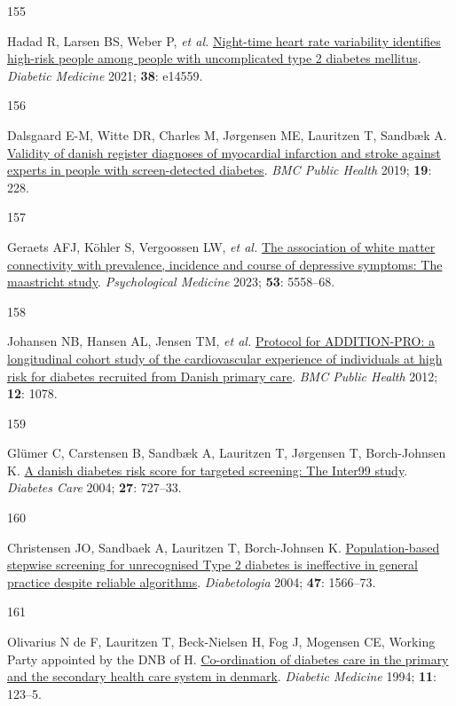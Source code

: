 \documentclass[
  a4paper,
  headsepline=true,
  open=any]{scrbook}
\newlength{\cslhangindent}
\newlength{\csllabelwidth}
\newlength{\cslentryspacingunit} %
\newenvironment{CSLReferences}[2] %
 {%
  \setlength{\parindent}{0pt}
  \ifodd #1
  \let\oldpar\par
  \def\par{\hangindent=\cslhangindent\oldpar}
  \fi
  \setlength{\parskip}{#2\cslentryspacingunit}
 }%
 {}
\newcommand{\CSLLeftMargin}[1]{\parbox[t]{\csllabelwidth}{#1}}
\newcommand{\CSLRightInline}[1]{\parbox[t]{\linewidth - \csllabelwidth}{#1}\break}
\begin{document}
\begin{CSLReferences}{0}{0}
\leavevmode{}%
\CSLLeftMargin{155 }%
\CSLRightInline{Hadad R, Larsen BS, Weber P, \emph{et al.}
\href{https://doi.org/10.1111/dme.14559}{Night-time heart rate
variability identifies high-risk people among people with uncomplicated
type 2 diabetes mellitus}. \emph{Diabetic Medicine} 2021; \textbf{38}:
e14559.}

\leavevmode{}%
\CSLLeftMargin{156 }%
\CSLRightInline{Dalsgaard E-M, Witte DR, Charles M, Jørgensen ME,
Lauritzen T, Sandbæk A.
\href{https://doi.org/10.1186/s12889-019-6549-z}{Validity of danish
register diagnoses of myocardial infarction and stroke against experts
in people with screen-detected diabetes}. \emph{BMC Public Health} 2019;
\textbf{19}: 228.}

\leavevmode{}%
\CSLLeftMargin{157 }%
\CSLRightInline{Geraets AFJ, Köhler S, Vergoossen LW, \emph{et al.}
\href{https://doi.org/10.1017/S0033291722002768}{The association of
white matter connectivity with prevalence, incidence and course of
depressive symptoms: The maastricht study}. \emph{Psychological
Medicine} 2023; \textbf{53}: 5558--68.}

\leavevmode{}%
\CSLLeftMargin{158 }%
\CSLRightInline{Johansen NB, Hansen AL, Jensen TM, \emph{et al.}
\href{https://doi.org/10.1186/1471-2458-12-1078}{Protocol for
ADDITION-PRO: a longitudinal cohort study of the cardiovascular
experience of individuals at high risk for diabetes recruited from
Danish primary care}. \emph{BMC Public Health} 2012; \textbf{12}: 1078.}

\leavevmode{}%
\CSLLeftMargin{159 }%
\CSLRightInline{Glümer C, Carstensen B, Sandbæk A, Lauritzen T,
Jørgensen T, Borch-Johnsen K.
\href{https://doi.org/10.2337/diacare.27.3.727}{A danish diabetes risk
score for targeted screening: The Inter99 study}. \emph{Diabetes Care}
2004; \textbf{27}: 727--33.}

\leavevmode{}%
\CSLLeftMargin{160 }%
\CSLRightInline{Christensen JO, Sandbaek A, Lauritzen T, Borch-Johnsen
K. \href{https://doi.org/10.1007/s00125-004-1496-2}{Population-based
stepwise screening for unrecognised Type 2 diabetes is ineffective in
general practice despite reliable algorithms}. \emph{Diabetologia} 2004;
\textbf{47}: 1566--73.}

\leavevmode{}%
\CSLLeftMargin{161 }%
\CSLRightInline{Olivarius N de F, Lauritzen T, Beck-Nielsen H, Fog J,
Mogensen CE, Working Party appointed by the DNB of H.
\href{https://doi.org/10.1111/j.1464-5491.1994.tb00243.x}{Co-ordination
of diabetes care in the primary and the secondary health care system in
denmark}. \emph{Diabetic Medicine} 1994; \textbf{11}: 123--5.}


\end{CSLReferences}
\end{document}
